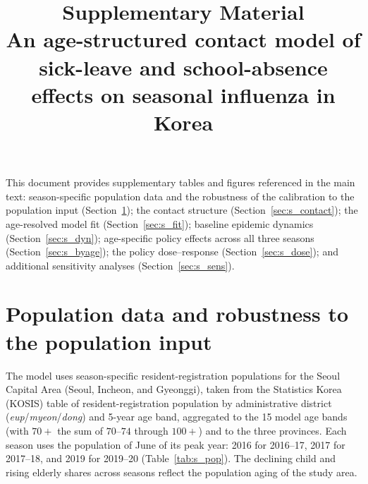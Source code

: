 \documentclass[12pt]{article}
\title{\vspace{-1.5em}Supplementary Material\\[0.4em]
\large An age-structured contact model of sick-leave and school-absence effects on seasonal influenza in Korea}
\author{}
\date{}
\begin{document}
\maketitle
\vspace{-2em}

This document provides supplementary tables and figures referenced in the main
text: season-specific population data and the robustness of the calibration to
the population input (Section~\ref{sec:s_pop}); the contact structure
(Section~\ref{sec:s_contact}); the age-resolved model fit (Section~\ref{sec:s_fit});
baseline epidemic dynamics (Section~\ref{sec:s_dyn}); age-specific policy effects
across all three seasons (Section~\ref{sec:s_byage}); the policy dose--response
(Section~\ref{sec:s_dose}); and additional sensitivity analyses
(Section~\ref{sec:s_sens}).

\section{Population data and robustness to the population input}
\label{sec:s_pop}

The model uses season-specific resident-registration populations for the Seoul
Capital Area (Seoul, Incheon, and Gyeonggi), taken from the Statistics Korea
(KOSIS) table of resident-registration population by administrative district
(\emph{eup}/\emph{myeon}/\emph{dong}) and 5-year age band, aggregated to the
15 model age bands (with $70+$ the sum of $70$--$74$ through $100+$) and to the
three provinces. Each season uses the population of June of its peak year:
2016 for 2016--17, 2017 for 2017--18, and 2019 for 2019--20 (Table~\ref{tab:s_pop}).
The declining child and rising elderly shares across seasons reflect the
population aging of the study area.
\end{document}
